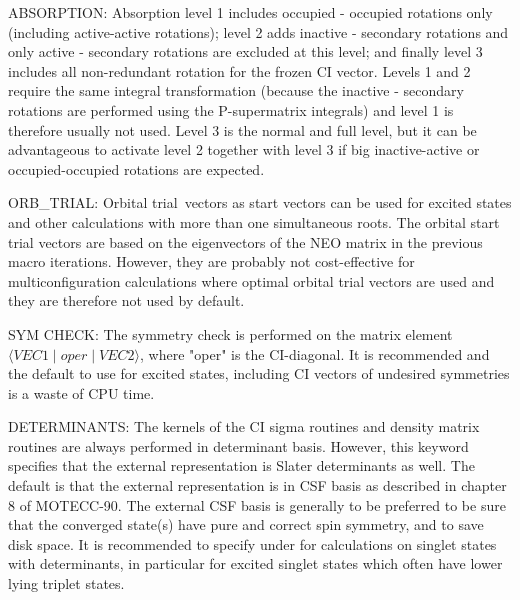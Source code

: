 ABSORPTION: Absorption level 1 includes occupied - occupied rotations
only (including active-active rotations); level 2 adds inactive -
secondary rotations and only active - secondary rotations are excluded
at this level; and finally level 3 includes all non-redundant rotation
for the frozen CI vector.  Levels 1 and 2 require the same integral
transformation (because the inactive - secondary rotations are
performed using the P-supermatrix integrals) and level 1 is therefore
usually not used. Level 3 is the normal and full level, but it can be
advantageous to activate level 2 together with level 3 if big
inactive-active or occupied-occupied rotations are expected.

ORB\_TRIAL: Orbital trial\ vectors as
start vectors can be used for
excited states and other calculations with more than one simultaneous
roots.  The orbital start trial vectors are based on the eigenvectors of
the NEO matrix in the previous macro iterations.  However, they are
probably not cost-effective for multiconfiguration calculations where
optimal orbital trial vectors are
used and they are therefore not used
by default.

SYM CHECK: The symmetry check is performed on the matrix element
$\langle VEC1 \mid oper \mid VEC2\rangle$, where "oper" is
the CI-diagonal.
It is recommended and the default to use 
for excited states, including
CI vectors of undesired symmetries is a waste of CPU time.

DETERMINANTS: The kernels of the CI sigma routines and density matrix
routines are always performed in determinant
basis.  However, this
keyword specifies that the external representation is Slater
determinants as well.  The default is that the external representation
is in CSF basis as
described in chapter 8 of MOTECC-90.  The external
CSF basis is
generally to be preferred to be sure that the converged
state(s) have pure and correct spin symmetry, and
to save disk space.
It is recommended to specify  under
 for
calculations on singlet states with
determinants,
in particular for
excited singlet states which often have lower lying triplet states.


\pagebreak[3]
\subsection{\label{ref-orbinp}}

